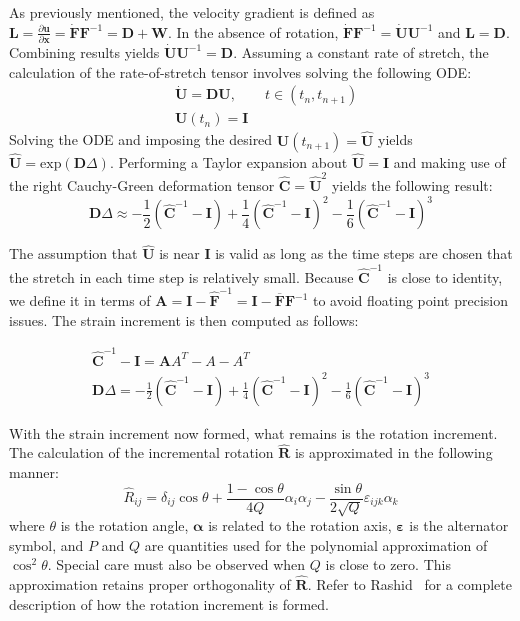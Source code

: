 As previously mentioned, the velocity gradient is defined as $\bm{L} = \frac{\partial \bm{u}}{\partial \bm{x}} = \dot{\bm{F}}\bm{F}^{-1} = \bm{D} + \bm{W}$. In the absence of rotation, $\dot{\bm{F}}\bm{F}^{-1} = \dot{\bm{U}}\bm{U}^{-1}$ and $\bm{L} = \bm{D}$. Combining results yields $\dot{\bm{U}}\bm{U}^{-1} = \bm{D}$. Assuming a constant rate of stretch, the calculation of the rate-of-stretch tensor involves solving the following ODE:
\begin{align}
&\dot{{\bm{U}}} = {\bm{D}}{\bm{U}}, \qquad t\in (t_n, t_{n+1}) \\
&{\bm{U}}\left(t_n\right) = \bm{I}
\end{align}
Solving the ODE and imposing the desired ${\bm{U}}(t_{n+1}) = \hat{\bm{U}}$ yields $\hat{\bm{U}} = \text{exp}(\bm{D}\Delta)$. Performing a Taylor expansion about $\hat{\bm{U}} = \bm{I}$ and making use of the right Cauchy-Green deformation tensor $\hat{\bm{C}} = \hat{\bm{U}}^2$ yields the following result: 
\begin{equation}
{\bm{D}}\Delta \approx -\frac{1}{2}(\hat{\bm C}^{-1} - {\bm{I}})+ \frac{1}{4} (\hat{\bm{C}}^{-1} - {\bm{I}})^{2} - \frac{1}{6} (\hat{\bm{C}}^{-1} - {\bm{I}})^{3}
\end{equation}

The assumption that $\hat{\bm{U}}$ is near $\bm{I}$ is valid as long as the time steps are chosen that the stretch in each time step is relatively small. Because $\hat{\bm{C}}^{-1}$ is close to identity, we define it in terms of $\bm{A} = \bm{I} - \hat{\bm{F}}^{-1} = \bm{I} - \bm{\overline{F}}\bm{F}^{-1}$ to avoid floating point precision issues. The strain increment is then computed as follows:

\begin{gather}
\hat{\bm C}^{-1} - {\bm I} = \bm A A^T - A - A^T \\
{\bm D}\Delta = -\frac{1}{2}(\hat{\bm C}^{-1} - {\bm I})+ \frac{1}{4} (\hat{\bm C}^{-1} - {\bm I})^{2} - \frac{1}{6} (\hat{\bm C}^{-1} - {\bm I})^{3}
\end{gather}

With the strain increment now formed, what remains is the rotation increment. The calculation of the incremental rotation $\hat{\bm{R}}$ is approximated in the following manner:
\begin{equation}
\hat{R}_{ij} = \delta_{ij}\cos\theta + \frac{1 - \cos \theta}{4Q}\alpha_i\alpha_j - \frac{\sin\theta}{2\sqrt{Q}}\varepsilon_{ijk}\alpha_{k}
\end{equation}
where $\theta$ is the rotation angle, $\boldsymbol{\alpha}$ is related to the rotation axis, $\boldsymbol{\varepsilon}$ is the alternator symbol, and $P$ and $Q$ are quantities used for the polynomial approximation of $\cos^2\theta$. Special care must also be observed when $Q$ is close to zero. This approximation retains proper orthogonality of $\hat{\bm{R}}$. Refer to Rashid~\cite{rashid_1993} for a complete description of how the rotation increment is formed.


